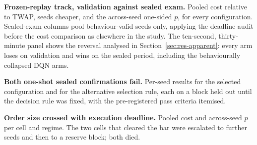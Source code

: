
\begin{table}[htbp]
\centering\scriptsize\setlength{\tabcolsep}{4pt}

\caption[Frozen-replay track: all fourteen configurations]{\textbf{Frozen-replay track,
validation against sealed exam.} Pooled cost relative to TWAP, seeds cheaper, and the
across-seed one-sided $p$, for every configuration. Sealed-exam columns pool
behaviour-valid seeds only, applying the deadline audit before the cost comparison as
elsewhere in the study. The ten-second, thirty-minute panel shows the reversal analysed in
Section~\ref{sec:res-apparent}: every arm loses on validation and wins on the sealed period,
including the behaviourally collapsed DQN arms.}
\label{tab:t7}
\end{table}

\begin{table}[htbp]
\centering\small

\caption[Sealed confirmations, reactive simulator]{\textbf{Both one-shot sealed
confirmations fail.} Per-seed results for the selected configuration and for the alternative
selection rule, each on a block held out until the decision rule was fixed, with the
pre-registered pass criteria itemised.}
\label{tab:t3}
\end{table}





\begin{table}[htbp]
\centering\scriptsize\setlength{\tabcolsep}{4pt}

\caption[Robustness grid]{\textbf{Order size crossed with execution deadline.} Pooled cost
and across-seed $p$ per cell and regime. The two cells that cleared the bar were escalated to
further seeds and then to a reserve block; both died.}
\label{tab:t4}
\end{table}




